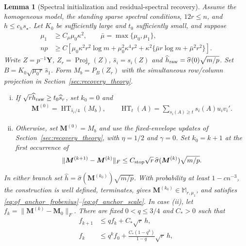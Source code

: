 \documentclass[numsec,webpdf,modern,large,namedate]{oup-authoring-template}
\theoremstyle{plain}
\newtheorem{slemma}{Lemma}%
\theoremstyle{remark}
\newcommand{\M}{\bm{M}}
\newcommand{\Y}{\bm{Y}}
\newif\ifmarkchanges
\newenvironment{revision}{\begingroup\ifmarkchanges\color{red}\fi}{\endgroup}
\begin{document}
\begin{revision}
\begin{slemma}[Spectral initialization and residual-spectral recovery]
\label{lem:of_anchor_stopping}
\label{lem:computable_initialization}
Assume the homogeneous model, the standing sparse spectral conditions,
$12r\le n$, and $h\le c_hs_\star$.  Let $K_0$ be sufficiently large and $t_0$ sufficiently small, and suppose
\begin{align}
 \mu_1&\ge C_\mu\mu_0\kappa^2,\qquad
 \bar\mu=\max\{\mu_0,\mu_1\},\label{eq:init_candidate_envelope}\\
 np&\ge C\left[\mu_0\kappa^2 r^2\log m+
                 \mu_0^2\kappa^4r^2+
        \kappa^2\{\bar\mu r\log m+\bar\mu^2r^2\}\right].
 \label{eq:init_default_sampling}
\end{align}
Write $Z=p^{-1}\Y$, $Z_r=\operatorname{Proj}_r(Z)$,
$\widehat s_i=s_i(Z)$ and
$\widehat h_{\rm raw}=\widehat\sigma(0)\sqrt{m/p}$. Set
$B=K_0\sqrt{\mu_0r}\,\widehat s_1$.  Form
$M_b=P_B(Z_r)$ with the simultaneous row/column projection in
Section~\ref{sec:recovery_theory}.
\begin{enumerate}[(i)]
\item\enspace If $\sqrt r\widehat h_{\rm raw}\ge t_0\widehat s_r$, set $k_0=0$ and
\begin{align}
 \M^{(0)}=\operatorname{HT}_{\widehat s_r/4}(M_b),\qquad
 \operatorname{HT}_t(A)=\sum_{s_i(A)\ge t}s_i(A)u_iv_i'.
 \label{eq:init_large_anchor}
\end{align}
\item\enspace Otherwise, set $\M^{(0)}=M_b$ and use the fixed-envelope
updates of Section~\ref{sec:recovery_theory}, with $\eta=1/2$ and $\gamma=0$.
Set $k_0=k+1$ at the first occurrence of
\begin{align}
 \|\M^{(k+1)}-\M^{(k)}\|_F
 \le C_{\rm stop}\sqrt r\,\widehat\sigma(\M^{(k)})\sqrt{m/p}.
 \label{eq:of_anchor_stop}
\end{align}
\end{enumerate}
In either branch set
$\widehat h=\widehat\sigma(\M^{(k_0)})\sqrt{m/p}$.
With probability at least $1-cn^{-3}$, the construction is well defined,
terminates, gives $\M^{(k_0)}\in\mathbb M_{r,\mu_1}$, and satisfies
\eqref{eq:of_anchor_frobenius}--\eqref{eq:of_anchor_scale}.
In case (ii), let $f_k=\|\M^{(k)}-\M_0\|_F$. There are fixed
$0<q\le3/4$ and $C_*>0$ such that
\begin{align}
 f_{k+1}&\le qf_k+C_*\sqrt r\,h,\label{eq:init_frob_recurrence}\\
 f_k&\le q^kf_0+\frac{C_*(1-q^k)}{1-q}\sqrt r\,h,
       \label{eq:recovery_explicit_geometric}

\end{align}
\end{slemma}
\end{revision}
\end{document}
